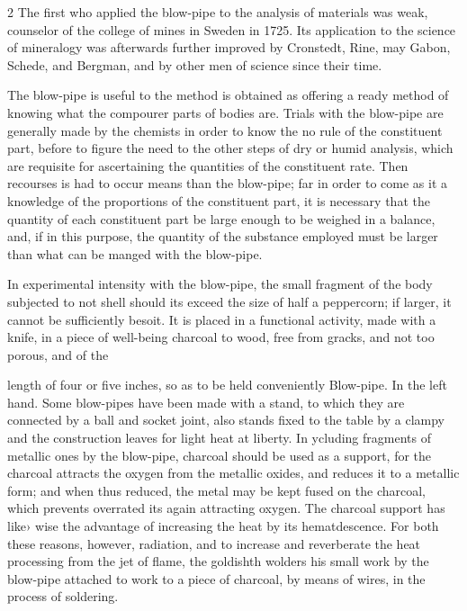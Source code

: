 \documentclass[10pt]{article}
\begin{document}
\begin{multicols}{2}
The first who applied the blow-pipe to the analysis of materials was weak, counselor of the college of mines in Sweden in 1725. Its application to the science of mineralogy was afterwards further improved by Cronstedt, Rine, may Gabon, Schede, and Bergman, and by other men of science since their time.

The blow-pipe is useful to the method is obtained as offering a ready method of knowing what the compourer parts of bodies are. Trials with the blow-pipe are generally made by the chemists in order to know the no rule of the constituent part, before to figure the need to the other steps of dry or humid analysis, which are requisite for ascertaining the quantities of the constituent rate. Then recourses is had to occur means than the blow-pipe; far in order to come as it a knowledge of the proportions of the constituent part, it is necessary that the quantity of each constituent part be large enough to be weighed in a balance, and, if in this purpose, the quantity of the substance employed must be larger than what can be manged with the blow-pipe.

In experimental intensity with the blow-pipe, the small fragment of the body subjected to not shell should its exceed the size of half a peppercorn; if larger, it cannot be sufficiently besoit. It is placed in a functional activity, made with a knife, in a piece of well-being charcoal to wood, free from gracks, and not too porous, and of the

length of four or five inches, so as to be held conveniently Blow-pipe. In the left hand. Some blow-pipes have been made with a stand, to which they are connected by a ball and socket joint, also stands fixed to the table by a clampy and the construction leaves for light heat at liberty. In ycluding fragments of metallic ones by the blow-pipe, charcoal should be used as a support, for the charcoal attracts the oxygen from the metallic oxides, and reduces it to a metallic form; and when thus reduced, the metal may be kept fused on the charcoal, which prevents overrated its again attracting oxygen. The charcoal support has like› wise the advantage of increasing the heat by its hematdescence. For both these reasons, however, radiation, and to increase and reverberate the heat processing from the jet of flame, the goldishth wolders his small work by the blow-pipe attached to work to a piece of charcoal, by means of wires, in the process of soldering.


\end{multicols}
\end{document}
